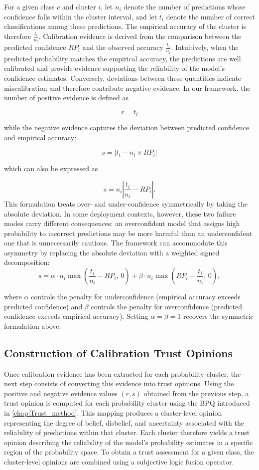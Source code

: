 For a given class $c$ and cluster $i$, let $n_i$ denote the number of predictions whose confidence falls within the cluster interval, and let $t_i$ denote the number of correct classifications among these predictions. The empirical accuracy of the cluster is therefore $\frac{t_i}{n_i}$. Calibration evidence is derived from the comparison between the predicted confidence $RP_i$ and the observed accuracy $\frac{t_i}{n_i}$. Intuitively, when the predicted probability matches the empirical accuracy, the predictions are well calibrated and provide evidence supporting the reliability of the model's confidence estimates. Conversely, deviations between these quantities indicate miscalibration and therefore contribute negative evidence. In our framework, the number of positive evidence is defined as

\[
r = t_i
\]

while the negative evidence captures the deviation between predicted
confidence and empirical accuracy:

\[
s = |t_i - n_i \times RP_i|
\]

which can also be expressed as

\[
s = n_i \left| \frac{t_i}{n_i} - RP_i \right|.
\]
This formulation treats over- and under-confidence symmetrically by taking the absolute deviation. In some deployment contexts, however, these two failure modes carry different consequences: an overconfident model that assigns high probability to incorrect predictions may be more harmful than an underconfident one that is unnecessarily cautious. The framework can accommodate this asymmetry by replacing the absolute deviation with a weighted signed decomposition:
\[
s = \alpha \cdot n_i \max\!\left(\frac{t_i}{n_i} - RP_i,\, 0\right)
  + \beta  \cdot n_i \max\!\left(RP_i - \frac{t_i}{n_i},\, 0\right),
\]

where $\alpha$ controls the penalty for underconfidence (empirical accuracy exceeds predicted confidence) and $\beta$ controls the penalty for overconfidence (predicted confidence exceeds empirical accuracy). Setting $\alpha = \beta = 1$ recovers the symmetric formulation above.

\subsection{Construction of Calibration Trust Opinions}
Once calibration evidence has been extracted for each probability cluster, the next step consists of converting this evidence into trust opinions. Using the positive and negative evidence values $(r,s)$ obtained from the previous step, a trust opinion is computed for each probability cluster using the \ac{BPQ} introduced in \cref{chap:Trust_method}. This mapping produces a cluster-level opinion representing the degree of belief, disbelief, and uncertainty associated with the reliability of predictions within that cluster. Each cluster therefore yields a trust opinion describing the reliability of the model's probability estimates in a specific region of the probability space. To obtain a trust assessment for a given class, the cluster-level opinions are combined using a subjective logic fusion operator.

